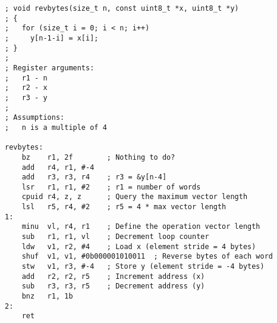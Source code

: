 \begin{lstlisting}[style=assembler]
; void revbytes(size_t n, const uint8_t *x, uint8_t *y)
; {
;   for (size_t i = 0; i < n; i++)
;     y[n-1-i] = x[i];
; }
;
; Register arguments:
;   r1 - n
;   r2 - x
;   r3 - y
;
; Assumptions:
;   n is a multiple of 4

revbytes:
    bz    r1, 2f        ; Nothing to do?
    add   r4, r1, #-4
    add   r3, r3, r4    ; r3 = &y[n-4]
    lsr   r1, r1, #2    ; r1 = number of words
    cpuid r4, z, z      ; Query the maximum vector length
    lsl   r5, r4, #2    ; r5 = 4 * max vector length
1:
    minu  vl, r4, r1    ; Define the operation vector length
    sub   r1, r1, vl    ; Decrement loop counter
    ldw   v1, r2, #4    ; Load x (element stride = 4 bytes)
    shuf  v1, v1, #0b000001010011  ; Reverse bytes of each word
    stw   v1, r3, #-4   ; Store y (element stride = -4 bytes)
    add   r2, r2, r5    ; Increment address (x)
    sub   r3, r3, r5    ; Decrement address (y)
    bnz   r1, 1b
2:
    ret
\end{lstlisting}

\twocolumn

